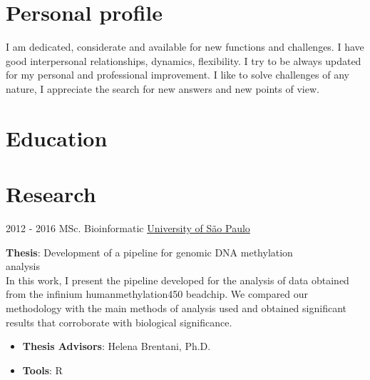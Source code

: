 \documentclass[letterpaper]{twentysecondcv} %
\begin{document}
\makeprofile %

\section{Personal profile}

I am dedicated, considerate and available for new functions and challenges. I have good interpersonal relationships, dynamics, flexibility. I try to be always updated for my personal and professional improvement. I like to solve challenges of any nature, I appreciate the search for new answers and new points of view. \vspace{2mm}

\section{Education}


\section{Research}
\begin{twenty}
	\twentyitem
    	{2012 - 2016}
		{}
        {MSc. Bioinformatic}
        {\href{http://www5.usp.br/}{University of São Paulo}}
        {}
        {
       	\textbf{Thesis}: Development of a pipeline for genomic DNA methylation \\ analysis \\
       	In this work, I present the pipeline developed for the analysis of data obtained from the infinium humanmethylation450 beadchip. We compared our methodology with the main methods of analysis used and obtained significant results that corroborate with biological significance.
        {\begin{itemize}
        \item \textbf{Thesis Advisors}: Helena Brentani, Ph.D.
        \item \textbf{Tools}: R \vspace{2mm}
		\end{itemize}}
        }
\end{twenty}
\end{document}
